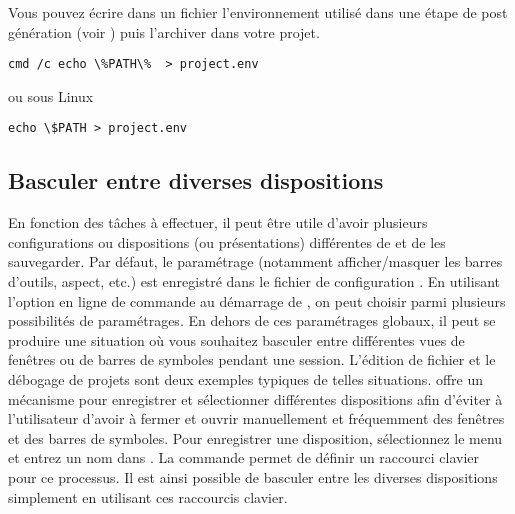 
Vous pouvez écrire dans un fichier  l'environnement utilisé dans une étape de post génération (voir ) puis l'archiver dans votre projet.

\begin{lstlisting}
cmd /c echo \%PATH\%  > project.env
\end{lstlisting}

ou sous Linux

\begin{lstlisting}
echo \$PATH > project.env
\end{lstlisting}

\subsection{Basculer entre diverses dispositions}

En fonction des tâches à effectuer, il peut être utile d'avoir plusieurs configurations ou dispositions (ou présentations) différentes de  \codeblocks et de les sauvegarder. Par défaut, le paramétrage (notamment afficher/masquer les barres d'outils, aspect, etc.) est enregistré dans le fichier de configuration . En utilisant l'option en ligne de commande  au démarrage de \codeblocks, on peut choisir parmi plusieurs possibilités de paramétrages. En dehors de ces paramétrages globaux, il peut se produire une situation où vous souhaitez basculer entre différentes vues de fenêtres ou de barres de symboles pendant une session. L'édition de fichier et le débogage de projets sont deux exemples typiques de telles situations. \codeblocks offre un mécanisme pour enregistrer et sélectionner différentes dispositions afin d'éviter à l'utilisateur d'avoir à fermer et ouvrir manuellement et fréquemment des fenêtres et des barres de symboles. Pour enregistrer une disposition, sélectionnez le menu  et entrez un nom dans . La commande  permet de définir un raccourci clavier pour ce processus. Il est ainsi possible de basculer entre les diverses dispositions simplement en utilisant ces raccourcis clavier.


